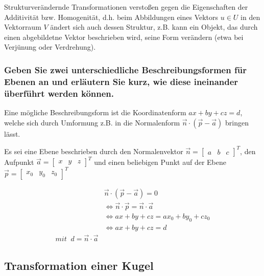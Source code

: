 \begin{itemize}
Strukturverändernde Transformationen verstoßen gegen die Eigenschaften der Additivität bzw. Homogenität, d.h. beim Abbildungen eines Vektors $u\in U$ in den Vektorraum $V$ ändert sich auch dessen Struktur, z.B. kann ein Objekt, das durch einen abgebildetne Vektor beschrieben wird, seine Form verändern (etwa bei Verjünung oder Verdrehung). 

\subsubsection{ Geben Sie zwei unterschiedliche Beschreibungsformen für Ebenen an und erläutern Sie kurz, wie diese
	ineinander überführt werden können.}

Eine mögliche Beschreibungsform ist die Koordinatenform $ax+by+cz=d$, welche sich durch Umformung z.B. in die Normalenform $\vec{n}\cdot(\vec{p} - \vec{a})$ bringen lässt.

Es sei eine Ebene beschrieben durch den Normalenvektor $\vec{n}=\begin{bmatrix}
a & b & c
\end{bmatrix}^T$, den Aufpunkt $\vec{a} = 
\begin{bmatrix}
x & y & z
\end{bmatrix}^T$ und einen beliebigen Punkt auf der Ebene $\vec{p} = 
\begin{bmatrix}
x_0 & y_0 & z_0
\end{bmatrix}^T$ 

\begin{equation}
\begin{aligned}
	&\vec{n} \cdot (\vec{p} - \vec{a}) = 0 \\
	&\iff \vec{n}\cdot \vec{p}   = \vec{n} \cdot \vec{a}\\
	&\iff ax + by+ cz = ax_0 + by_0 + cz_0\\
	&\iff ax + by + cz = d\\ mit\,\,\ d = \vec{n}\cdot\vec{a}
\end{aligned}
\end{equation}

\end{itemize}

\subsection{Transformation einer Kugel}
